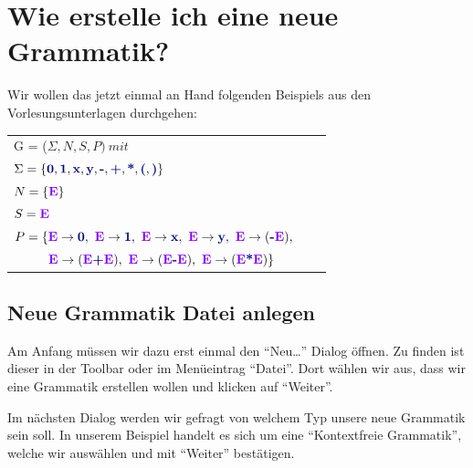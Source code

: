 

\chapter{Wie erstelle ich eine neue Grammatik?}\label{Grammar}

Wir wollen das jetzt einmal an Hand folgenden Beispiels aus den
Vorlesungsunterlagen durchgehen:\vspace{10pt}


\begin{tabular}{lcr}
G = ($\Sigma, N, S, P )\ mit $\\
$\Sigma = \{\TerminalSymbol{0}, \TerminalSymbol{1}, \TerminalSymbol{x},
\TerminalSymbol{y}, \TerminalSymbol{-}, \TerminalSymbol{+},
\TerminalSymbol{*}, \TerminalSymbol{(}, \TerminalSymbol{)}\}$\\ $N =
\{\StartSymbol{E}\}$\\ $S=\StartSymbol{E}$\\
$P = \{\StartSymbol{E} \to \TerminalSymbol{0},\ \StartSymbol{E} \to \TerminalSymbol{1},\
\StartSymbol{E}	\to \TerminalSymbol{x},\ \StartSymbol{E} \to \TerminalSymbol{y},\
\StartSymbol{E} \to (\TerminalSymbol{-}\StartSymbol{E}),$\\
$\ \ \ \ \ \ \ \ \StartSymbol{E} \to (\StartSymbol{E} \TerminalSymbol{+}
\StartSymbol{E}),\ \StartSymbol{E} \to (\StartSymbol{E} \TerminalSymbol{-} \StartSymbol{E}),\
\StartSymbol{E} \to (\StartSymbol{E} \TerminalSymbol{*} \StartSymbol{E})\}$\\
\end{tabular}

\section{Neue Grammatik Datei anlegen}

Am Anfang müssen wir dazu erst einmal den "`Neu\ldots"' Dialog öffnen. Zu finden
ist dieser in der Toolbar oder im Menüeintrag "`Datei"'. Dort wählen wir aus,
dass wir eine Grammatik erstellen wollen und klicken auf "`Weiter"'.\vspace{10pt}

Im nächsten Dialog werden wir gefragt von welchem Typ unsere neue Grammatik
sein soll. In unserem Beispiel handelt es sich um eine "`Kontextfreie
Grammatik"', welche wir auswählen und mit "`Weiter"' bestätigen.\vspace{10pt}

